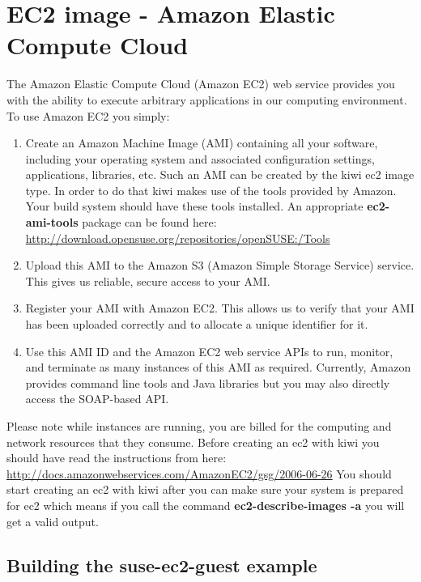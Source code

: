 \chapter{EC2 image - Amazon Elastic Compute Cloud}
\label{chapter:ec2}
\minitoc

The Amazon Elastic Compute Cloud (Amazon EC2) web service provides you
with the ability to execute arbitrary applications in our computing
environment. To use Amazon EC2 you simply:

\begin{enumerate}
\item Create an Amazon Machine Image (AMI) containing all your software,
      including your operating system and associated configuration settings,
      applications, libraries, etc. Such an AMI can be created by the kiwi
      ec2 image type. In order to do that kiwi makes use of the tools
      provided by Amazon. Your build system should have these tools
      installed. An appropriate \textbf{ec2-ami-tools} package can be
      found here:\\
      \url{http://download.opensuse.org/repositories/openSUSE:/Tools}
\item Upload this AMI to the Amazon S3 (Amazon Simple Storage Service)
      service. This gives us reliable, secure access to your AMI.
\item Register your AMI with Amazon EC2. This allows us to verify that your
      AMI has been uploaded correctly and to allocate a unique identifier
      for it.
\item Use this AMI ID and the Amazon EC2 web service APIs to run, monitor,
      and terminate as many instances of this AMI as required. Currently,
      Amazon provides command line tools and Java libraries but you may also
      directly access the SOAP-based API.
\end{enumerate}

Please note while instances are running, you are billed for the
computing and network resources that they consume. Before creating an
ec2 with kiwi you should have read the instructions from here:\\
\url{http://docs.amazonwebservices.com/AmazonEC2/gsg/2006-06-26}
You should start creating an ec2 with kiwi after you can make sure
your system is prepared for ec2 which means if you call the command
\textbf{ec2-describe-images -a} you will get a valid output.

\section{Building the suse-ec2-guest example}

